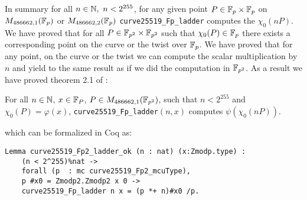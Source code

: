 In summary for all $n \in \mathbb{N},\ n < 2^{255}$, for any given point $P\in\mathbb{F}_{p}\times\mathbb{F}_{p}$ on $M_{486662,1}(\mathbb{F}_{p})$ or $M_{486662,2}(\mathbb{F}_{p})$ \texttt{curve25519\_Fp\_ladder} computes the $\chi_0(nP)$.
We have proved that for all $P \in \mathbb{F}_{p^2}\times\mathbb{F}_{p^2}$ such that $\chi_0(P) \in \mathbb{F}_{p}$ there exists a corresponding point on the curve or the twist over $\mathbb{F}_{p}$.
We have proved that for any point, on the curve or the twist we can compute the scalar multiplication by $n$ and yield to the same result as if we did the computation in $\mathbb{F}_{p^2}$. As a result we have proved theorem 2.1 of \cite{Ber06}:
\begin{theorem}
For all $n \in \mathbb{N}$, $x \in \mathbb{F}_{P}$, $P \in M_{486662,1}(\mathbb{F}_{p^2})$, such that $n < 2^{255}$ and $\chi_0(P) = \varphi(x)$, \texttt{curve25519\_Fp\_ladder}$(n, x)$ computes $\psi(\chi_0(nP))$.
\end{theorem}
which can be formalized in Coq as:
\begin{lstlisting}[language=Coq]
Lemma curve25519_Fp2_ladder_ok (n : nat) (x:Zmodp.type) :
    (n < 2^255)%nat ->
    forall (p  : mc curve25519_Fp2_mcuType),
    p #x0 = Zmodp2.Zmodp2 x 0 ->
    curve25519_Fp_ladder n x = (p *+ n)#x0 /p.
\end{lstlisting}
